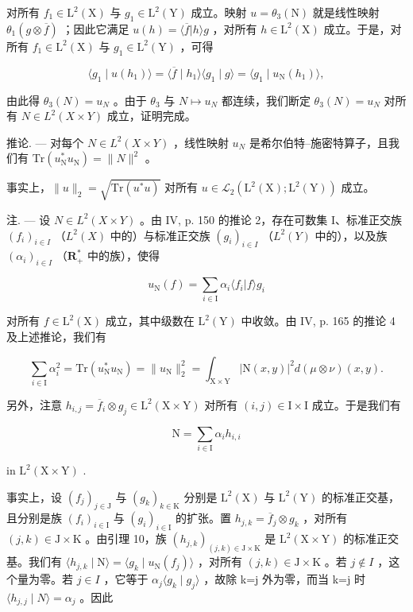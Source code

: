 对所有 \(f_1 \in \mathrm{L}^2(\mathrm{X})\) 与 \(g_1 \in \mathrm{L}^2(\mathrm{Y})\) 成立。映射 \(u = \theta_3(\mathrm{N})\) 就是线性映射 \(\theta_1(g \otimes \overline{f})\) ；因此它满足 \(u(h) = \langle \overline{f} | h \rangle g\) ，对所有 \(h \in \mathrm{L}^2(\mathrm{X})\) 成立。于是，对所有 \(f_1 \in \mathrm{L}^2(\mathrm{X})\) 与 \(g_1 \in \mathrm{L}^2(\mathrm{Y})\) ，可得

\[
\langle g _ {1} \mid u (h _ {1}) \rangle = \langle \overline {{f}} \mid h _ {1} \rangle \langle g _ {1} \mid g \rangle = \langle g _ {1} \mid u _ {\mathrm{N}} (h _ {1}) \rangle ,
\]

由此得 \(\theta_3(N) = u_N\) 。由于 \(\theta_3\) 与 \(N \mapsto u_N\) 都连续，我们断定 \(\theta_3(N) = u_N\) 对所有 \(N \in L^2(X \times Y)\) 成立，证明完成。

推论. --- 对每个 \(N \in L^{2}(X \times Y)\) ，线性映射 \(u_{N}\) 是希尔伯特--施密特算子，且我们有 \(\mathrm{Tr}(u_{\mathrm{N}}^{*}u_{\mathrm{N}}) = \|N\|^{2}\) 。

事实上，\(\| u\| _2 = \sqrt{\mathrm{Tr}(u^*u)}\) 对所有 \(u\in \mathcal{L}_2(\mathrm{L}^2 (\mathrm{X});\mathrm{L}^2 (\mathrm{Y}))\) 成立。

注. --- 设 \(N \in L^{2}(X \times Y)\) 。由 IV, p. 150 的推论 2，存在可数集 I、标准正交族 \((f_{i})_{i \in I}\) （\(L^{2}(X)\) 中的）与标准正交族 \((g_{i})_{i \in I}\) （\(L^{2}(Y)\) 中的），以及族 \((\alpha_{i})_{i \in I}\) （\(\mathbf{R}_{+}^{*}\) 中的族），使得

\[
u _ {\mathrm{N}} (f) = \sum_ {i \in \mathrm{I}} \alpha_ {i} \langle f _ {i} | f \rangle g _ {i}
\]

对所有 \(f \in \mathrm{L}^2(\mathrm{X})\) 成立，其中级数在 \(\mathrm{L}^2(\mathrm{Y})\) 中收敛。由 IV, p. 165 的推论 4 及上述推论，我们有

\[
\sum_ {i \in \mathrm{I}} \alpha_ {i} ^ {2} = \mathrm{Tr} (u _ {\mathrm{N}} ^ {*} u _ {\mathrm{N}}) = \| u _ {\mathrm{N}} \| _ {2} ^ {2} = \int_ {\mathrm{X} \times \mathrm{Y}} | \mathrm{N} (x, y) | ^ {2} d (\mu \otimes \nu) (x, y).
\]

另外，注意 \(h_{i,j} = \overline{f}_{i} \otimes g_{j} \in \mathrm{L}^{2}(\mathrm{X} \times \mathrm{Y})\) 对所有 \((i, j) \in \mathrm{I} \times \mathrm{I}\) 成立。于是我们有

\[
\mathrm{N} = \sum_ {i \in \mathrm{I}} \alpha_ {i} h _ {i, i}
\]

in \(\mathrm{L}^2 (\mathrm{X}\times \mathrm{Y})\) .

事实上，设 \((f_{j})_{j\in\mathrm{J}}\) 与 \((g_{k})_{k\in\mathrm{K}}\) 分别是 \(\mathrm{L}^{2}(\mathrm{X})\) 与 \(\mathrm{L}^{2}(\mathrm{Y})\) 的标准正交基，且分别是族 \((f_{i})_{i\in\mathrm{I}}\) 与 \((g_{i})_{i\in\mathrm{I}}\) 的扩张。置 \(h_{j,k}=\overline{f}_{j}\otimes g_{k}\) ，对所有 \((j,k)\in\mathrm{J}\times\mathrm{K}\) 。由引理 10，族 \((h_{j,k})_{(j,k)\in\mathrm{J}\times\mathrm{K}}\) 是 \(\mathrm{L}^{2}(\mathrm{X}\times\mathrm{Y})\) 的标准正交基。我们有 \(\langle h_{j,k}\mid\mathrm{N}\rangle=\langle g_{k}\mid u_{\mathrm{N}}(f_{j})\rangle\) ，对所有 \((j,k)\in\mathrm{J}\times\mathrm{K}\) 。若 \(j\notin I\) ，这个量为零。若 \(j\in I\) ，它等于 \(\alpha_{j}\langle g_{k}\mid g_{j}\rangle\) ，故除 k=j 外为零，而当 k=j 时 \(\langle h_{j,j}\mid N\rangle=\alpha_{j}\) 。因此

